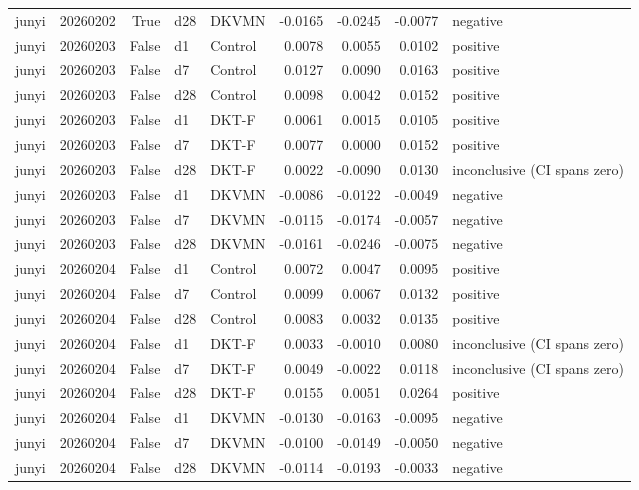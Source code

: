 \begin{tabular}{lrrllrrrl}
junyi & 20260202 & True & d28 & DKVMN & -0.0165 & -0.0245 & -0.0077 & negative \\
junyi & 20260203 & False & d1 & Control & 0.0078 & 0.0055 & 0.0102 & positive \\
junyi & 20260203 & False & d7 & Control & 0.0127 & 0.0090 & 0.0163 & positive \\
junyi & 20260203 & False & d28 & Control & 0.0098 & 0.0042 & 0.0152 & positive \\
junyi & 20260203 & False & d1 & DKT-F & 0.0061 & 0.0015 & 0.0105 & positive \\
junyi & 20260203 & False & d7 & DKT-F & 0.0077 & 0.0000 & 0.0152 & positive \\
junyi & 20260203 & False & d28 & DKT-F & 0.0022 & -0.0090 & 0.0130 & inconclusive (CI spans zero) \\
junyi & 20260203 & False & d1 & DKVMN & -0.0086 & -0.0122 & -0.0049 & negative \\
junyi & 20260203 & False & d7 & DKVMN & -0.0115 & -0.0174 & -0.0057 & negative \\
junyi & 20260203 & False & d28 & DKVMN & -0.0161 & -0.0246 & -0.0075 & negative \\
junyi & 20260204 & False & d1 & Control & 0.0072 & 0.0047 & 0.0095 & positive \\
junyi & 20260204 & False & d7 & Control & 0.0099 & 0.0067 & 0.0132 & positive \\
junyi & 20260204 & False & d28 & Control & 0.0083 & 0.0032 & 0.0135 & positive \\
junyi & 20260204 & False & d1 & DKT-F & 0.0033 & -0.0010 & 0.0080 & inconclusive (CI spans zero) \\
junyi & 20260204 & False & d7 & DKT-F & 0.0049 & -0.0022 & 0.0118 & inconclusive (CI spans zero) \\
junyi & 20260204 & False & d28 & DKT-F & 0.0155 & 0.0051 & 0.0264 & positive \\
junyi & 20260204 & False & d1 & DKVMN & -0.0130 & -0.0163 & -0.0095 & negative \\
junyi & 20260204 & False & d7 & DKVMN & -0.0100 & -0.0149 & -0.0050 & negative \\
junyi & 20260204 & False & d28 & DKVMN & -0.0114 & -0.0193 & -0.0033 & negative \\
\bottomrule
\end{tabular}
